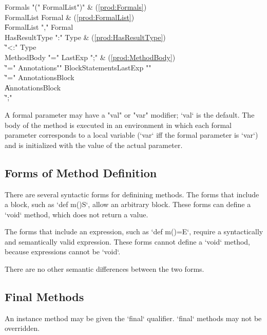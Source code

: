 \begin{bbgrammar}
             Formals \: \xcd"(" FormalList\opt \xcd")" & (\ref{prod:Formals}) \\
          FormalList \: Formal & (\ref{prod:FormalList}) \\
                     \| FormalList \xcd"," Formal \\
       HasResultType \: \xcd":" Type & (\ref{prod:HasResultType}) \\
                     \| \xcd"<:" Type \\
          MethodBody \: \xcd"=" LastExp \xcd";" & (\ref{prod:MethodBody}) \\
                     \| \xcd"=" Annotations\opt \xcd"{" BlockStatements\opt LastExp \xcd"}" \\
                     \| \xcd"=" Annotations\opt Block \\
                     \| Annotations\opt Block \\
                     \| \xcd";" \\
\end{bbgrammar}


A formal parameter may have a \xcd"val" or \xcd"var"
modifier; \xcd`val` is the default.
The body of the method is executed in an environment in which 
each formal parameter corresponds to a local variable (\xcd`var` iff the
formal parameter is \xcd`var`)
and is initialized with the value of the actual parameter.

\subsection{Forms of Method Definition}

There are several syntactic forms for definining methods.   The forms that
include a block, such as \xcd`def m(){S}`, allow an arbitrary block.  These
forms can define a \xcd`void` method, which does not return a value. 

The
forms that include an expression, such as \xcd`def m()=E`, require a
syntactically and semantically valid expression.   These forms cannot define a
\xcd`void` method, because expressions cannot be \xcd`void`.  

There are no other semantic differences between the two forms. 

\subsection{Final Methods}
An instance method may be given the \xcd`final` qualifier.  \xcd`final`
methods may not be overridden.

